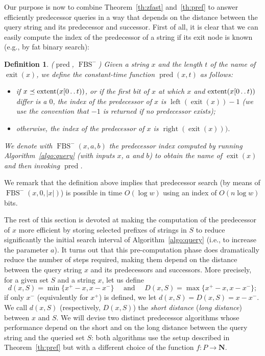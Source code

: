 \documentclass{article}
\newtheorem{definition}{Definition}
\newcommand{\exit}[1]{\operatorname{exit}(#1)}
\newcommand{\pred}{\operatorname{pred}}
\newcommand{\fbs}{\operatorname{FBS}}
\newcommand{\N}{\mathbf N}
\newcommand{\?}{\mskip1.5mu}
\newcommand{\lrange}{\operatorname{left}}
\newcommand{\rrange}{\operatorname{right}}
\newcommand{\extent}{\operatorname{extent}}
\def\..{\,\mathpunct{\ldotp\ldotp}} %
\begin{document}
Our purpose is now to combine Theorem~\ref{th:zfast} and~\ref{th:pref} to answer
efficiently predecessor queries in a way that depends on the distance
between the query string and its predecessor and successor. 
First of all, it is clear that we can easily compute the index of the 
predecessor of a string if its exit node is known (e.g., by fat binary search): 
\begin{definition}($\pred$, $\fbs^-$)
Given a string $x$ and the length $t$ of the name of $\exit x$, we define the constant-time function $\pred(x,t)$
as follows:
\begin{itemize}
  \item if $x \preceq \extent(x[0\..t))$, or if the first bit of $x$ at which $x$
  and $\extent(x[0\..t))$ differ is a $0$, 
  the index of the predecessor of $x$ is $\lrange(\exit x)-1$ (we use the
  convention that $-1$ is returned if no predecessor exists);
  \item otherwise, the index of the predecessor of $x$ is $\rrange(\exit x))$.
\end{itemize}
 We denote with $\fbs^-(x,a,b)$ the predecessor index computed by running Algorithm~\ref{algo:query} 
 (with inputs $x$, $a$ and $b$) to obtain the name of $\exit x$ and then invoking $\pred$.
\end{definition}
We remark that the definition above implies that predecessor search
(by means of $\fbs^-(x,0,|x|)$) is possible in time $O(\log w)$ using an index
of $O(n\log w)$ bits.

The rest of this section is devoted at making the computation of the
predecessor of $x$  
more efficient by storing selected prefixes of strings in $S$ 
to reduce significantly the initial search interval of
Algorithm~\ref{algo:query} (i.e., to increase the parameter $a$).
It turns out that this pre-computation phase does dramatically reduce the number
of steps required, making them depend on the distance between the query string
$x$ and its predecessors and successors. More precisely, for a given set $S$ and
a string $x$, let us define
\[
	d(x,S) = \min\{x^+-x,x-x^-\} \quad\text{ and }\quad
	D(x,S) = \max\{x^+-x,x-x^-\};	
\]
if only $x^-$ (equivalently for $x^+$) is defined, we let $d(x,S)=D(x,S)=x-x^-$.
We call $d(x,S)$ (respectively, $D(x,S)$) the \emph{short
distance} (\emph{long distance}) between $x$ and $S$. We will devise two
distinct predecessor algorithms whose performance depend on the short and on the
long distance between the query string and the queried set $S$:
both algorithms use the setup described in Theorem~\ref{th:pref} but with a
different choice of the function $f:P\to \N$. 
\end{document}
